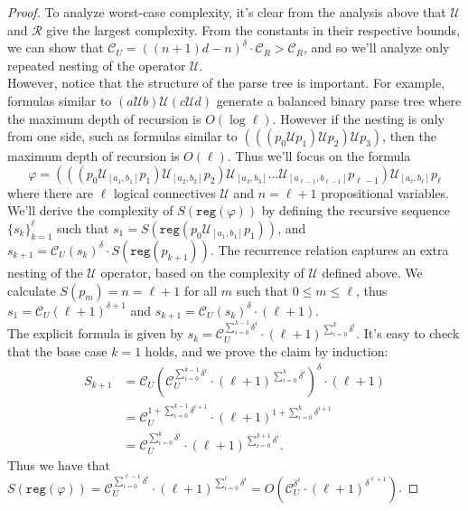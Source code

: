 \documentclass[runningheads]{llncs}
\renewcommand{\phi}{\varphi}
\begin{document}
\begin{proof}
    To analyze worst-case complexity, it's clear from the analysis above that $\mathcal{U}$ and $\mathcal{R}$ give the largest complexity. From the constants in their respective bounds, we can show that $\mathcal{C}_U = ((n+1)d - n)^\delta \cdot \mathcal{C}_R > \mathcal{C}_R$, and so we'll analyze only repeated nesting of the operator $\mathcal{U}$.\\
    However, notice that the structure of the parse tree is important. For example, formulas similar to $(a \mathcal{U} b) \mathcal{U} (c \mathcal{U} d)$ generate a balanced binary parse tree where the maximum depth of recursion is $O(\log \ell)$. However if the nesting is only from one side, such as formulas similar to $(((p_0 \mathcal{U} p_1) \mathcal{U} p_2) \mathcal{U} p_3)$, then the maximum depth of recursion is $O(\ell)$. Thus we'll focus on the formula $$\phi = (((p_0 \mathcal{U}_{[a_1, b_1]} p_1) \mathcal{U}_{[a_2, b_2]} p_2) \mathcal{U}_{[a_3, b_3]}... \mathcal{U}_{[a_{\ell - 1}, b_{\ell - 1}]} p_{\ell - 1}) \mathcal{U}_{[a_\ell, b_\ell]} p_\ell$$ where there are $\ell$ logical connectives $\mathcal{U}$ and $n = \ell + 1$ propositional variables.\\
    We'll derive the complexity of $S(\texttt{reg}(\phi))$ by defining the recursive sequence $\{s_k\}_{k = 1}^\ell$ such that $s_1 = S(\texttt{reg}(p_0 \mathcal{U}_{[a_1, b_1]} p_1))$, and $s_{k+1} = \mathcal{C}_U (s_k)^\delta \cdot S(\texttt{reg}(p_{k+1}))$. The recurrence relation captures an extra nesting of the $\mathcal{U}$ operator, based on the complexity of $\mathcal{U}$ defined above. We calculate $S(p_m) = n = \ell + 1$ for all $m$ such that $0 \leq m \leq \ell$, thus $s_1 = \mathcal{C}_U(\ell + 1)^{\delta + 1}$ and $s_{k+1} = \mathcal{C}_U (s_k)^\delta \cdot (\ell + 1)$. \\
    The explicit formula is given by $s_k = \mathcal{C}_U^{\sum_{i = 0}^{k - 1} \delta^i} \cdot (\ell + 1)^{\sum_{i = 0}^{k} \delta^i}$. It's easy to check that the base case $k = 1$ holds, and we prove the claim by induction:
    \begin{align*}
        S_{k + 1} &= \mathcal{C}_U (\mathcal{C}_U^{\sum_{i = 0}^{k - 1} \delta^i} \cdot (\ell + 1)^{\sum_{i = 0}^{k} \delta^i}) ^ \delta \cdot (\ell + 1) \\
        &= \mathcal{C}_U^{1 + \sum_{i = 0}^{k - 1} \delta^{i + 1}} \cdot (\ell + 1)^{1 + \sum_{i = 0}^{k} \delta^{i + 1}} \\
        &= \mathcal{C}_U^{\sum_{i = 0}^k \delta^i} \cdot (\ell + 1)^{\sum_{i = 0}^{k+1} \delta^i}.
    \end{align*}
    Thus we have that $S(\texttt{reg}(\phi)) = \mathcal{C}_U^{\sum_{i = 0}^{\ell - 1} \delta^i} \cdot (\ell + 1)^{\sum_{i = 0}^{\ell} \delta^i} = O(\mathcal{C}_U^{\delta ^ \ell} \cdot (\ell + 1)^{\delta^{\ell + 1}})$.
 \end{proof}
\end{document}
